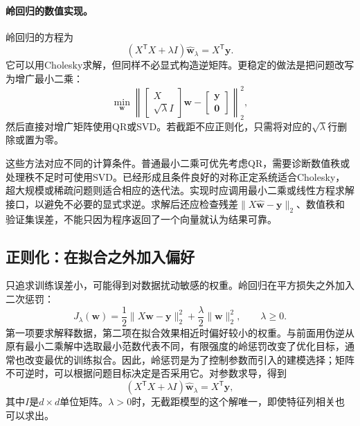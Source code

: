 \paragraph{岭回归的数值实现。}
岭回归的方程为
\begin{equation}
 (X^{\mathsf T}X+\lambda I)\hat{\bm w}_\lambda=X^{\mathsf T}\bm y.
\end{equation}
它可以用Cholesky求解，但同样不必显式构造逆矩阵。更稳定的做法是把问题改写为增广最小二乘：
\begin{equation}
 \min_{\bm w}
 \left\|\begin{bmatrix}X\\ \sqrt{\lambda}I\end{bmatrix}\bm w-
 \begin{bmatrix}\bm y\\ \bm0\end{bmatrix}\right\|_2^2,
\end{equation}
然后直接对增广矩阵使用QR或SVD。若截距不应正则化，只需将对应的$\sqrt{\lambda}$行删除或置为零。

这些方法对应不同的计算条件。普通最小二乘可优先考虑QR，需要诊断数值秩或处理秩不足时可使用SVD。已经形成且条件良好的对称正定系统适合Cholesky，超大规模或稀疏问题则适合相应的迭代法。实现时应调用最小二乘或线性方程求解接口，以避免不必要的显式求逆。求解后还应检查残差$\|X\hat{\bm w}-\bm y\|_2$、数值秩和验证集误差，不能只因为程序返回了一个向量就认为结果可靠。

\subsection{正则化：在拟合之外加入偏好}
只追求训练误差小，可能得到对数据扰动敏感的权重。岭回归在平方损失之外加入二次惩罚\cite{hoerl1970ridge}：
\begin{equation}
 J_\lambda(\bm w)=\frac12\|X\bm w-\bm y\|_2^2
 +\frac\lambda2\|\bm w\|_2^2,\qquad\lambda\geq0.\label{eq:linear-ridge-objective}
\end{equation}
第一项要求解释数据，第二项在拟合效果相近时偏好较小的权重。与前面用伪逆从原有最小二乘解中选取最小范数代表不同，有限强度的岭惩罚改变了优化目标，通常也改变最优的训练拟合。因此，岭惩罚是为了控制参数而引入的建模选择；矩阵不可逆时，可以根据问题目标决定是否采用它。对参数求导，得到
\begin{equation}
 (X^{\mathsf T}X+\lambda I)\hat{\bm w}_\lambda=X^{\mathsf T}\bm y,
\end{equation}
其中$I$是$d\times d$单位矩阵。$\lambda>0$时，无截距模型的这个解唯一，即使特征列相关也可以求出。

